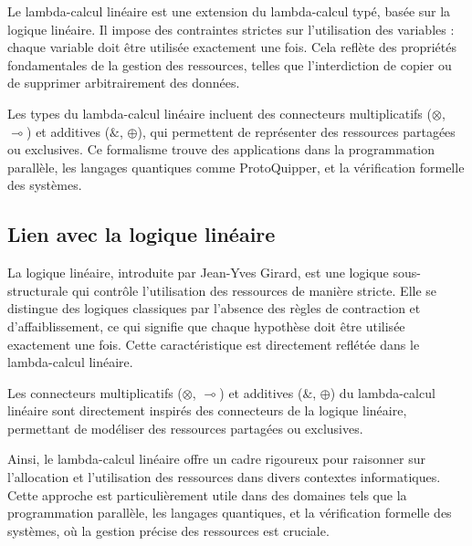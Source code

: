 Le lambda-calcul linéaire est une extension du lambda-calcul typé, basée sur la logique linéaire. Il impose des contraintes strictes sur l'utilisation des variables : chaque variable doit être utilisée exactement une fois. Cela reflète des propriétés fondamentales de la gestion des ressources, telles que l'interdiction de copier ou de supprimer arbitrairement des données.

Les types du lambda-calcul linéaire incluent des connecteurs multiplicatifs (\( \otimes \), \( \multimap \)) et additives (\( \& \), \( \oplus \)), qui permettent de représenter des ressources partagées ou exclusives. Ce formalisme trouve des applications dans la programmation parallèle, les langages quantiques comme ProtoQuipper, et la vérification formelle des systèmes.

\subsection{Lien avec la logique linéaire}

La logique linéaire, introduite par Jean-Yves Girard, est une logique sous-structurale qui contrôle l'utilisation des ressources de manière stricte. Elle se distingue des logiques classiques par l'absence des règles de contraction et d'affaiblissement, ce qui signifie que chaque hypothèse doit être utilisée exactement une fois. Cette caractéristique est directement reflétée dans le lambda-calcul linéaire.

Les connecteurs multiplicatifs (\( \otimes \), \( \multimap \)) et additives (\( \& \), \( \oplus \)) du lambda-calcul linéaire sont directement inspirés des connecteurs de la logique linéaire, permettant de modéliser des ressources partagées ou exclusives.

Ainsi, le lambda-calcul linéaire offre un cadre rigoureux pour raisonner sur l'allocation et l'utilisation des ressources dans divers contextes informatiques. Cette approche est particulièrement utile dans des domaines tels que la programmation parallèle, les langages quantiques, et la vérification formelle des systèmes, où la gestion précise des ressources est cruciale.